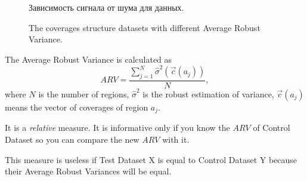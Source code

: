 \documentclass{article}
\begin{document}
\begin{figure}[h!]
\begin{minipage}[h]{0.4\linewidth}
\end{minipage}
\hfill
\begin{minipage}[h]{0.4\linewidth}
\end{minipage}
\caption{Зависимость сигнала от шума для данных.}
\begin{minipage}[h]{0.4\linewidth}
\end{minipage}
\hfill
\begin{minipage}[h]{0.4\linewidth}
\end{minipage}
\caption{The coverages structure datasets with different Average Robust Variance.}
\label{ris:image1}
\end{figure}

The Average Robust Variance is calculated as $$ARV = \frac{\sum_{j = 1}^N {\hat{\sigma}^2(\vec{c}(a_j)) }}{N },$$ where $N$ is the number of regions, $\hat{\sigma}^2$ is the robust estimation of variance, $\vec{c}(a_j)$ means the vector of coverages of region $a_j$.

It is a {\it relative} measure. It is informative only if you know the $ARV$ of Control Dataset so you can compare the new $ARV$ with it.

This measure is useless if Test Dataset X is equal to Control Dataset Y because their Average Robust Variances will be equal.
\end{document}
